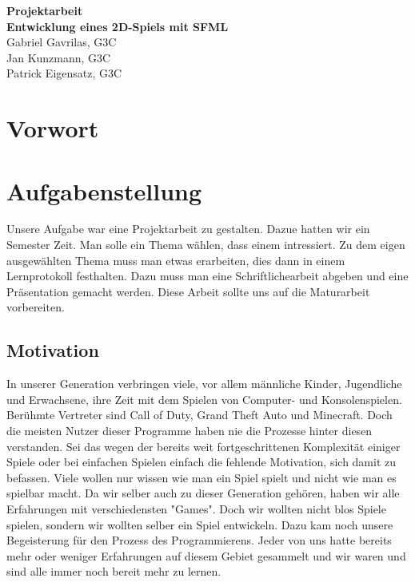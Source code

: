 \documentclass[12pt,a4paper]{scrartcl}
\begin{document}
\begin{titlepage}
\begin{center}

\vspace*{3cm}
\textbf{\huge{Projektarbeit}}\\
\vspace*{2cm}
\textbf{\large{Entwicklung eines 2D-Spiels mit SFML}}\\
\vspace*{5cm}
Gabriel Gavrilas, G3C\\
Jan Kunzmann, G3C\\
Patrick Eigensatz, G3C
\end{center}
\end{titlepage}




\newpage

\setcounter{page}{1}
\section*{Vorwort}


\newpage

\tableofcontents

\newpage

\section{Aufgabenstellung} 
Unsere Aufgabe war eine Projektarbeit zu gestalten. Dazue hatten wir ein Semester Zeit. Man solle ein Thema
wählen, dass einem intressiert. Zu dem eigen ausgewählten Thema muss man etwas erarbeiten, dies dann in einem Lernprotokoll festhalten.
Dazu muss man eine Schriftlichearbeit abgeben und eine Präsentation gemacht werden. Diese Arbeit sollte uns auf die Maturarbeit
vorbereiten.

\subsection{Motivation}
In unserer Generation verbringen viele, vor allem männliche Kinder, Jugendliche und Erwachsene,
ihre Zeit mit dem Spielen von Computer- und Konsolenspielen.
Berühmte Vertreter sind Call of Duty, Grand Theft Auto und Minecraft.
Doch die meisten Nutzer dieser Programme haben nie die Prozesse hinter diesen verstanden.
Sei das wegen der bereits weit fortgeschrittenen Komplexität einiger Spiele 
oder bei einfachen Spielen einfach die fehlende Motivation, sich damit zu befassen.
Viele wollen nur wissen wie man ein Spiel spielt und nicht wie man es spielbar macht.
Da wir selber auch zu dieser Generation gehören, 
haben wir alle Erfahrungen mit verschiedensten "Games".
Doch wir wollten nicht blos Spiele spielen, 
sondern wir wollten selber ein Spiel entwickeln.
Dazu kam noch unsere Begeisterung für den Prozess des Programmierens.
Jeder von uns hatte bereits mehr oder weniger Erfahrungen auf diesem Gebiet gesammelt 
und wir waren und sind alle immer noch bereit mehr zu lernen.
\end{document}
